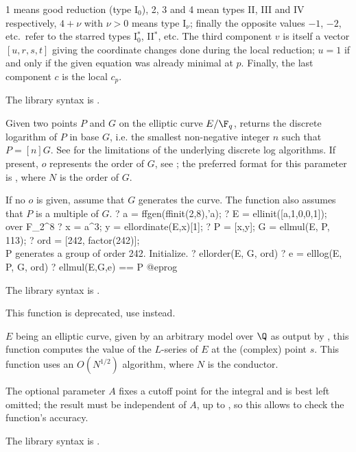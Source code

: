 1 means good reduction (type I$_0$), 2, 3 and 4 mean types II, III and IV
respectively, $4+\nu$ with $\nu>0$ means type I$_\nu$;
finally the opposite values $-1$, $-2$, etc.~refer to the starred types
I$_0^*$, II$^*$, etc. The third component $v$ is itself a vector $[u,r,s,t]$
giving the coordinate changes done during the local reduction;
$u = 1$ if and only if the given equation was already minimal at $p$.
Finally, the last component $c$ is the local  $c_p$.

The library syntax is .

\label{se:elllog}
Given two points $P$ and $G$ on the elliptic curve $E/\F_q$, returns the
discrete logarithm of $P$ in base $G$, i.e. the smallest non-negative
integer $n$ such that $P = [n]G$.
See  for the limitations of the underlying discrete log algorithms.
If present, $o$ represents the order of $G$, see ;
the preferred format for this parameter is \kbd{[N, factor(N)]}, where $N$
is  the order of $G$.

If no $o$ is given, assume that $G$ generates the curve.
The function also assumes that $P$ is a multiple of $G$.
\bprog
? a = ffgen(ffinit(2,8),'a);
? E = ellinit([a,1,0,0,1]);  \\ over F_{2^8}
? x = a^3; y = ellordinate(E,x)[1];
? P = [x,y]; G = ellmul(E, P, 113);
? ord = [242, factor(242)]; \\ P generates a group of order 242. Initialize.
? ellorder(E, G, ord)
? e = elllog(E, P, G, ord)
? ellmul(E,G,e) == P
@eprog

The library syntax is .

\label{se:elllseries}
This function is deprecated, use  instead.

$E$ being an elliptic curve, given by an arbitrary model over $\Q$ as output
by , this function computes the value of the $L$-series of $E$ at
the (complex) point $s$. This function uses an $O(N^{1/2})$ algorithm, where
$N$ is the conductor.

The optional parameter $A$ fixes a cutoff point for the integral and is best
left omitted; the result must be independent of $A$, up to
, so this allows to check the function's accuracy.

The library syntax is .

